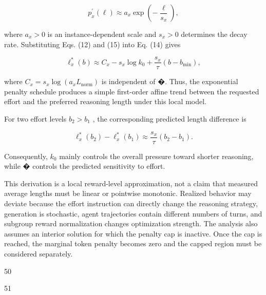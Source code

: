 \documentclass[
  10
]{article}
\begin{document}
\[
p _ { x } ^ { \prime } ( \ell ) \approx a _ { x } \exp \left( - \frac { \ell } { s _ { x } } \right) ,\tag{15}
\]

where \(a _ { x } > 0\) is an instance-dependent scale and
\(s _ { x } > 0\) determines the decay rate. Substituting Eqs. (12) and
(15) into Eq. (14) gives

\[
\ell _ { x } ^ { \ast } ( b ) \approx C _ { x } - s _ { x } \log k _ { 0 } + \frac { s _ { x } } { \tau } ( b - b _ { \mathrm { m i n } } ) ,\tag{16}
\]

where
\(C _ { x } = s _ { x } \log ( a _ { x } L _ { \mathrm { n o r m } } )\)
is independent of �. Thus, the exponential penalty schedule produces a
simple first-order affine trend between the requested effort and the
preferred reasoning length under this local model.

For two effort levels \(b _ { 2 } > b _ { 1 }\) , the corresponding
predicted length difference is

\[
\ell _ { x } ^ { \ast } ( b _ { 2 } ) - \ell _ { x } ^ { \ast } ( b _ { 1 } ) \approx \frac { s _ { x } } { \tau } ( b _ { 2 } - b _ { 1 } ) .\tag{17}
\]

Consequently, \(k _ { 0 }\) mainly controls the overall pressure toward
shorter reasoning, while � controls the predicted sensitivity to effort.

This derivation is a local reward-level approximation, not a claim that
measured average lengths must be linear or pointwise monotonic. Realized
behavior may deviate because the effort instruction can directly change
the reasoning strategy, generation is stochastic, agent trajectories
contain different numbers of turns, and subgroup reward normalization
changes optimization strength. The analysis also assumes an interior
solution for which the penalty cap is inactive. Once the cap is reached,
the marginal token penalty becomes zero and the capped region must be
considered separately.

50

51
\end{document}

